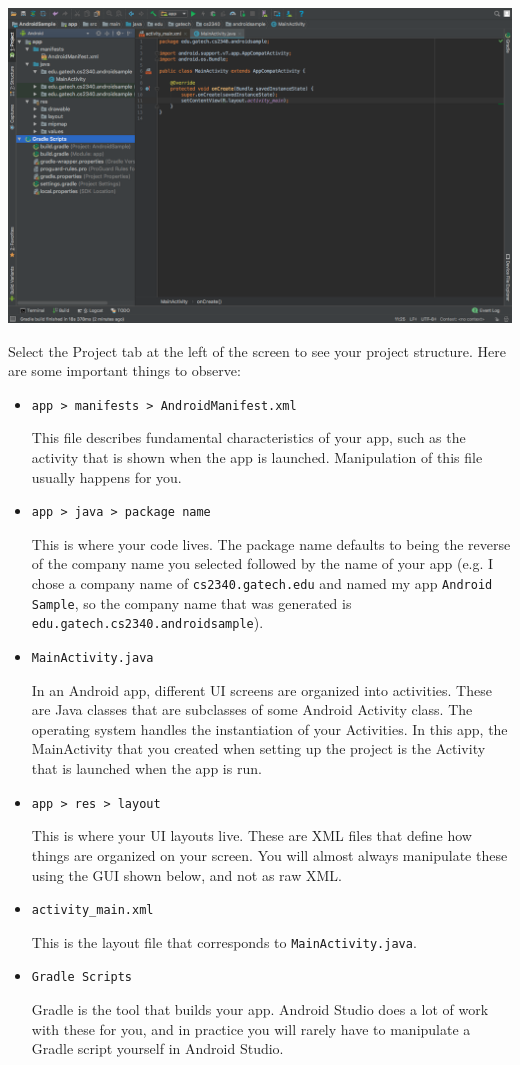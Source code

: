 \documentclass{article}
\begin{document}
\begin{center}\includegraphics[width=.5\textwidth]{images/ide.png}\end{center}
Select the Project tab at the left of the screen to see your project structure. Here are some important things to observe:
\begin{itemize}
\item \texttt{app > manifests > AndroidManifest.xml} 

This file describes fundamental characteristics of your app, such as the activity that is shown when the app is launched. Manipulation of this file usually happens for you.
\item \texttt{app > java > package name}

This is where your code lives. The package name defaults to being the reverse of the company name you selected followed by the name of your app (e.g. I chose a company name of \texttt{cs2340.gatech.edu} and named my app \texttt{Android Sample}, so the company name that was generated is \texttt{edu.gatech.cs2340.androidsample}).
\item \texttt{MainActivity.java}

In an Android app, different UI screens are organized into activities. These are Java classes that are subclasses of some Android Activity class. The operating system handles the instantiation of your Activities. In this app, the MainActivity that you created when setting up the project is the Activity that is launched when the app is run.
\item \texttt{app > res > layout}

This is where your UI layouts live. These are XML files that define how things are organized on your screen. You will almost always manipulate these using the GUI shown below, and not as raw XML.
\item \texttt{activity\_main.xml}

This is the layout file that corresponds to \texttt{MainActivity.java}.
\item \texttt{Gradle Scripts}

Gradle is the tool that builds your app. Android Studio does a lot of work with these for you, and in practice you will rarely have to manipulate a Gradle script yourself in Android Studio.
\end{itemize}
\end{document}

